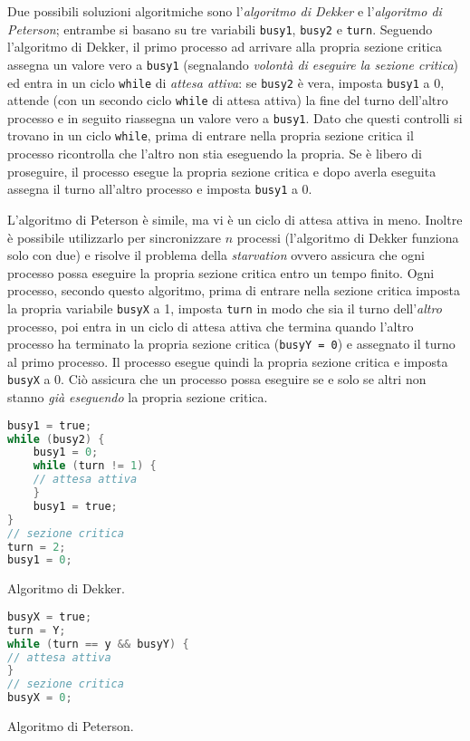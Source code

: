 \documentclass[answers,a4paper,12pt]{exam}
\begin{document}
\begin{questions}
\begin{solutionorlines}[3.8in]
	Due possibili soluzioni algoritmiche sono l'\textit{algoritmo di Dekker} e l'\textit{algoritmo di Peterson}; entrambe si basano su tre variabili \texttt{busy1}, \texttt{busy2} e \texttt{turn}.	Seguendo l'algoritmo di Dekker, il primo processo ad arrivare alla propria sezione critica assegna un valore vero a \texttt{busy1} (segnalando \textit{volontà di eseguire la sezione critica}) ed entra in un ciclo \texttt{while} di \textit{attesa attiva}: se \texttt{busy2} è vera, imposta \texttt{busy1} a 0, attende (con un secondo ciclo \texttt{while} di attesa attiva) la fine del turno dell'altro processo e in seguito riassegna un valore vero a \texttt{busy1}. Dato che questi controlli si trovano in un ciclo \texttt{while}, prima di entrare nella propria sezione critica il processo ricontrolla che l'altro non stia eseguendo la propria. Se è libero di proseguire, il processo esegue la propria sezione critica e dopo averla eseguita assegna il turno all'altro processo e imposta \texttt{busy1} a 0.
	
	L'algoritmo di Peterson è simile, ma vi è un ciclo di attesa attiva in meno. Inoltre è possibile utilizzarlo per sincronizzare $n$ processi (l'algoritmo di Dekker funziona solo con due) e risolve il problema della \textit{starvation} ovvero assicura che ogni processo possa eseguire la propria sezione critica entro un tempo finito. Ogni processo, secondo questo algoritmo, prima di entrare nella sezione critica imposta la propria variabile \texttt{busyX} a 1, imposta \texttt{turn} in modo che sia il turno dell'\textit{altro} processo, poi entra in un ciclo di attesa attiva che termina quando l'altro processo ha terminato la propria sezione critica (\texttt{busyY = 0}) e assegnato il turno al primo processo. Il processo esegue quindi la propria sezione critica e imposta \texttt{busyX} a 0. Ciò assicura che un processo possa eseguire se e solo se altri non stanno \textit{già eseguendo} la propria sezione critica.
		\begin{minipage}{.50\textwidth}
			\centering
			\label{alg:alg1}
			\begin{lstlisting}[language=C]
busy1 = true;
while (busy2) {
	busy1 = 0;
	while (turn != 1) {
	// attesa attiva
	}
	busy1 = true;
}
// sezione critica
turn = 2;
busy1 = 0;
\end{lstlisting}

Algoritmo di Dekker.

		\end{minipage}
		\begin{minipage}{.50\textwidth}
			\centering
			\label{alg:alg2}
			\begin{lstlisting}[language=C]
busyX = true;
turn = Y;
while (turn == y && busyY) {
// attesa attiva
}
// sezione critica
busyX = 0;
\end{lstlisting}
Algoritmo di Peterson.
		\end{minipage}
	

\end{solutionorlines}
\end{questions}
\end{document}
